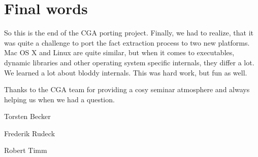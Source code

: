 
\section{Final words} So this is the end of the CGA porting project. Finally, we had to realize, that it was quite a challenge to port the fact extraction process to two new platforms. Mac OS X and Linux are quite similar, but when it comes to executables, dynamic libraries and other operating system specific internals, they differ a lot. We learned a lot about bloddy internals. This was hard work, but fun as well. 

Thanks to the CGA team for providing a cosy seminar atmosphere and always helping us when we had a question.

Torsten Becker

Frederik Rudeck

Robert Timm 
